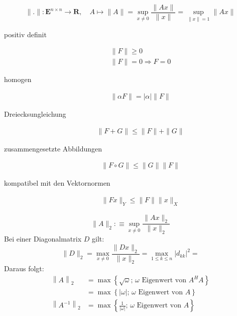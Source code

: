 \documentclass[a4paper,twocolumn]{article}
\begin{document}
		\begin{fdef}[Matrixnorm]
			$$ \| . \|: \mathbf{E}^{n \times n} \rightarrow \mathbf{R}, \quad A \mapsto \| A \| = \sup_{x \neq 0} \frac{\| Ax \|}{\| x \|} = \sup_{\| x \| = 1} \| Ax \|$$
			\begin{description}
			\item[positiv definit] 
				\begin{align*}
					\| F \| \geq 0 \\
					\| F \| = 0 \Rightarrow F = 0
				\end{align*}
			\item[homogen]
				\begin{align*}
					\| \alpha F \| = |\alpha | \| F \|
				\end{align*}
			\item[Dreiecksungleichung]
				\begin{align*}
					\| F + G \| \leq \| F \| + \| G \|
				\end{align*}
			\item[zusammengesetzte Abbildungen]
				\begin{align*}
					\| F \circ G \| \leq \| G \| \| F \|
				\end{align*}
			\item[kompatibel mit den Vektornormen]
				\begin{align*}
					\| Fx \|_Y \leq \| F \| \| x \|_X
				\end{align*}
			\end{description}

		\end{fdef}
		
		\begin{fdef}[Spektralnorm]
			$$ \| A \|_2: \equiv \sup_{x \neq 0} \frac{\| Ax \|_2}{\| x \|_2} $$
			Bei einer Diagonalmatrix $D$ gilt:
			$$ \| D \|_2 = \max_{x \neq 0} \frac{\| Dx \|_2}{\| x \|_2} = \max_{1 \leq k \leq n} | d_{kk} |^2 = $$
			Daraus folgt:
			\begin{align*}
				\left\| A \right\|_2 &= \max \left\{ \sqrt{\omega}\text{; $\omega$ Eigenwert von $A^HA$}\right\}\\
						&= \max \left\{|\omega| \text{; $\omega$ Eigenwert von $A$}\right\}\\
				\left\| A^{-1} \right\|_2 &= \max \left\{ \frac{1}{| \omega |} \text{; $\omega$ Eigenwert von $A$}\right\}
			\end{align*}

		\end{fdef}
		
\end{document}
